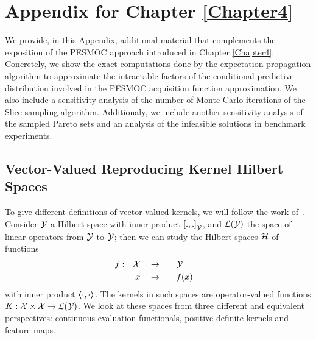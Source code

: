 
\chapter{Appendix for Chapter \ref{Chapter4}}
\label{AppendixB}

We provide, in this Appendix, additional material that complements the exposition of the PESMOC approach introduced in Chapter \ref{Chapter4}. Concretely, we show the exact computations done by the expectation propagation algorithm to approximate the intractable factors of the conditional predictive distribution involved in the PESMOC acquisition function approximation. We also include a sensitivity analysis of the number of Monte Carlo iterations of the Slice sampling algorithm. Additionaly, we include another sensitivity analysis of the sampled Pareto sets and an analysis of the infeasible solutions in benchmark experiments.


\section{Vector-Valued Reproducing Kernel Hilbert Spaces}%
To give different definitions of vector-valued kernels, we will follow the work of~\citet{MicchelliP05}.
Consider $\mathcal{Y}$ a Hilbert space with inner product $\left[ ., . \right]_\mathcal{Y}$, and $\mathcal{L}(\mathcal{Y})$ the space of linear operators from $\mathcal{Y}$ to $\mathcal{Y}$; then we can study the Hilbert spaces $\mathcal{H}$ of functions
\begin{equation*}
    \begin{aligned}
        f: &  & \mathcal{X} &  &  & \to &  &  &  & \mathcal{Y} &  & \\
           &  & x       &  &  & \to &  &  &  & f(x)    &  &
    \end{aligned}
\end{equation*}
with inner product $\bm{\left\langle} \cdot, \cdot \bm{\right\rangle}$.
The kernels in such spaces are operator-valued functions $K: \mathcal{X} \times \mathcal{X} \to \mathcal{L}(\mathcal{Y})$.
We look at these spaces from three different and equivalent perspectives: continuous evaluation functionals, positive-definite kernels and feature maps.

